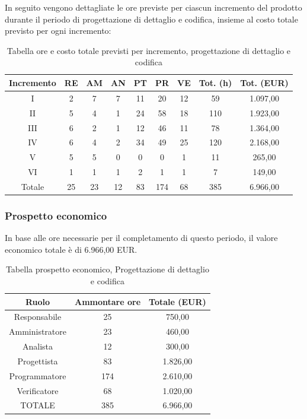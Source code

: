 \FloatBarrier
\noindent In seguito vengono dettagliate le ore previste per ciascun incremento del prodotto durante il periodo di progettazione di dettaglio e codifica, insieme al costo totale previsto per ogni incremento:
\begin{table}[h]
	\caption{Tabella ore e costo totale previsti per incremento, progettazione di dettaglio e codifica}
	\begin{center}
		\begin{tabular}{ |c|c|c|c|c|c|c|c|c|  }
			\hline
			Incremento 		& RE 	& AM 	& AN 	& PT 	& PR 	& VE 	& Tot. (h) & Tot. (EUR) \\
			\hline\hline
			I		& 2 		& 7			& 7 	& 11 	& 20 		& 12 		& 59	 & 1.097,00\\
			II		& 5 		& 4 		& 1 	& 24	& 58 		& 18 		&110	&1.923,00\\
			III		& 6 		& 2 		& 1 	& 12	& 46 		& 11 		& 78	&1.364,00\\
			IV		& 6 		& 4 		& 2 	& 34 	& 49 		& 25 		& 120 	&2.168,00\\
			V		& 5 		& 5 		& 0 	& 0		& 0 		& 1	 		& 11			&265,00\\
			VI		& 1 		& 1 		& 1 	& 2 	& 1 		& 1 		& 7			&149,00\\
			\hline\hline
			Totale		& 25		& 23		& 12 	& 83	 	& 174 	& 68 	& 385 	&6.966,00\\
			\hline
		\end{tabular}
	\end{center}
\end{table}

\subsubsection{Prospetto economico}
In base alle ore necessarie per il completamento di questo periodo, il valore economico totale è di 6.966,00 EUR.
\begin{table}[h!]
\caption{Tabella prospetto economico, Progettazione di dettaglio e codifica}
\begin{center}
\begin{tabular}{ |c|c|c|  }
 \hline
 Ruolo 		& Ammontare ore 	& Totale (EUR)\\
 	\hline
 \hline
 	Responsabile	& 25 		& 750,00\\
	Amministratore	& 23		& 460,00\\
	Analista		& 12 	& 300,00\\
	Progettista		& 83		& 1.826,00\\
	Programmatore	& 174		& 2.610,00 \\
	Verificatore	& 68 	& 1.020,00\\
 \hline\hline
 TOTALE		& 385		& 6.966,00\\
  \hline
\end{tabular}
\end{center}
\end{table}
\newpage

